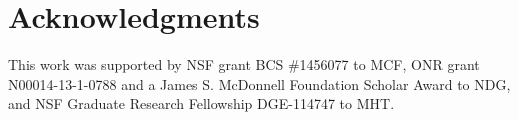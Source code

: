 \documentclass[10pt,letterpaper]{article}
\begin{document}
\section{Acknowledgments}

This work was supported by NSF grant BCS \#1456077 to MCF, ONR grant N00014-13-1-0788 and a James S. McDonnell Foundation Scholar Award to NDG, and NSF Graduate Research Fellowship DGE-114747 to MHT. 


\setlength{\bibleftmargin}{.125in}
\setlength{\bibindent}{-\bibleftmargin}


\end{document}
